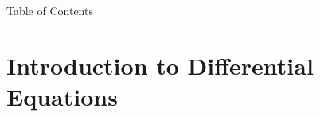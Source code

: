 

 \begin{frame}{Table of Contents }
\mapofcontentsB{\bd}
 \end{frame}

\section{Introduction to Differential Equations}
